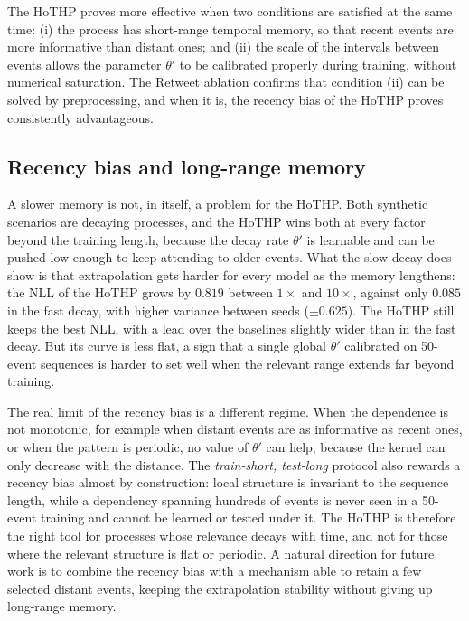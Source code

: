 The HoTHP proves more effective when two conditions are satisfied at the same time: (i) the process has short-range temporal memory, so that recent events are more informative than distant ones; and (ii) the scale of the intervals between events allows the parameter $\theta'$ to be calibrated properly during training, without numerical saturation. The Retweet ablation confirms that condition (ii) can be solved by preprocessing, and when it is, the recency bias of the HoTHP proves consistently advantageous.

\subsection{Recency bias and long-range memory}
\label{subsec:memoria-longo-alcance}

A slower memory is not, in itself, a problem for the HoTHP. Both synthetic scenarios are decaying processes, and the HoTHP wins both at every factor beyond the training length, because the decay rate $\theta'$ is learnable and can be pushed low enough to keep attending to older events. What the slow decay does show is that extrapolation gets harder for every model as the memory lengthens: the NLL of the HoTHP grows by $0.819$ between $1\times$ and $10\times$, against only $0.085$ in the fast decay, with higher variance between seeds ($\pm 0.625$). The HoTHP still keeps the best NLL, with a lead over the baselines slightly wider than in the fast decay. But its curve is less flat, a sign that a single global $\theta'$ calibrated on 50-event sequences is harder to set well when the relevant range extends far beyond training.

The real limit of the recency bias is a different regime. When the dependence is not monotonic, for example when distant events are as informative as recent ones, or when the pattern is periodic, no value of $\theta'$ can help, because the kernel can only decrease with the distance. The \textit{train-short, test-long} protocol also rewards a recency bias almost by construction: local structure is invariant to the sequence length, while a dependency spanning hundreds of events is never seen in a 50-event training and cannot be learned or tested under it. The HoTHP is therefore the right tool for processes whose relevance decays with time, and not for those where the relevant structure is flat or periodic. A natural direction for future work is to combine the recency bias with a mechanism able to retain a few selected distant events, keeping the extrapolation stability without giving up long-range memory.

